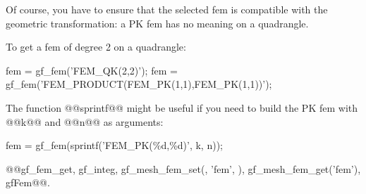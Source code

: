 \begin{cmddescription}
   Of course, you have to ensure that the selected fem is compatible with the
   geometric transformation: a PK fem has no meaning on a quadrangle.
\end{cmddescription}
\begin{cmdexamples}
  To get a fem of degree 2 on a quadrangle:
  \begin{mcode}
fem = gf\_fem('FEM\_QK(2,2)');
fem = gf\_fem('FEM\_PRODUCT(FEM\_PK(1,1),FEM\_PK(1,1))');
  \end{mcode}
  
  The \mlab function @@sprintf@@ might be useful if you need to build the PK
  fem with @@k@@ and @@n@@ as arguments:
  \begin{mcode}
fem = gf\_fem(sprintf('FEM\_PK(\%d,\%d)', k, n));
  \end{mcode}
\end{cmdexamples}
\begin{gfseealso}
  @@gf_fem_get, gf\_integ, gf\_mesh\_fem\_set(\tmf, 'fem', \tfem), gf\_mesh\_fem\_get('fem'), gfFem@@.
\end{gfseealso}
\newpage

